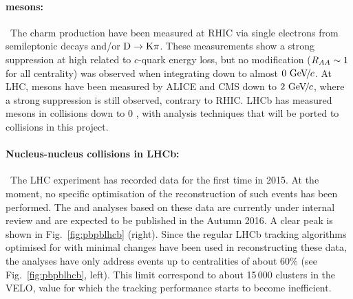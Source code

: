 \documentclass[a4paper,11pt]{article}
\begin{document}
\paragraph{\D mesons:\ }\ 
The charm production have been measured at RHIC via single
electrons from semileptonic decays and/or $\text{D} \to \text{K}\pi$. These measurements show a strong suppression at
high \pt related to $c$-quark energy loss, but no modification ($R_{AA} \sim 1$ for all centrality) was observed
when integrating down to almost $0\,{\,\text{Ge\hspace{-.08em}V\hspace{-0.16em}/\hspace{-0.08em}}c}$. 
At LHC, \D mesons have been measured by ALICE and CMS down to $2\,{\,\text{Ge\hspace{-.08em}V\hspace{-0.16em}/\hspace{-0.08em}}c}$, where
a strong suppression is still observed, contrary to RHIC. 
LHCb has measured \D mesons in \ppb collisions down to 0 \pt, with analysis techniques
that will be ported to \pbpb collisions in this project.



\paragraph{Nucleus-nucleus collisions in LHCb:\ }\ 
The LHC experiment has recorded \pbpb data for the first time in 2015. At the moment, no specific optimisation of the reconstruction of such events has been performed. 
The \Dz and \Jpsi analyses based on these data are currently under internal review and are expected to be published in the Autumn 2016. A clear \Dz peak is shown in Fig.~\ref{fig:pbpblhcb} (right). Since the regular LHCb tracking algorithms optimised for \pp with minimal changes have been used in reconstructing these data, the analyses have only address events up to centralities of about 60\% (see Fig.~\ref{fig:pbpblhcb}, left). This limit correspond to about 15\,000 clusters in the VELO, value for which the tracking performance starts to become inefficient.
\end{document}

